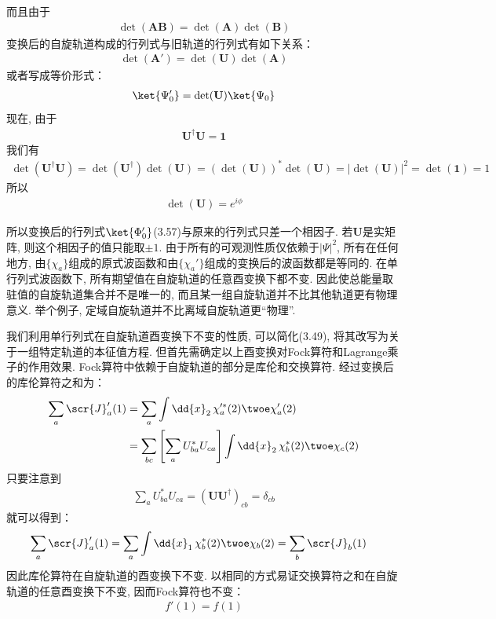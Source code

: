 而且由于
\begin{align}
	\det(\mathbf{AB}) = \det(\mathbf{A})\det(\mathbf{B})
\end{align}
变换后的自旋轨道构成的行列式与旧轨道的行列式有如下关系：
\begin{align}
	\det(\mathbf{A}') = \det(\mathbf{U})\det(\mathbf{A})
\end{align}
或者写成等价形式：
\begin{align}
	\ket{\Psi_0'} = \det(\mathbf{U})\ket{\Psi_0}
\end{align}
现在, 
由于
\begin{align}
	\mathbf{U}^\dagger\mathbf{U} = \mathbf{1}
\end{align}
我们有
\begin{align}
	\det(\mathbf{U}^\dagger\mathbf{U}) = \det(\mathbf{U}^\dagger)\det(\mathbf{U}) = (\det(\mathbf{U}))^*\det(\mathbf{U}) = |\det(\mathbf{U})|^2 = \det(\mathbf{1}) = 1
\end{align}
所以
\begin{align}
	\det(\mathbf{U}) = e^{i\phi}
\end{align}

所以变换后的行列式$\ket{\Phi_0'}$(3.57)与原来的行列式只差一个相因子. 
若$\mathbf{U}$是实矩阵, 
则这个相因子的值只能取$\pm 1$. 
由于所有的可观测性质仅依赖于$|\Psi|^2$, 
所有在任何地方, 
由$\{\chi_a\}$组成的原式波函数和由$\{\chi_a'\}$组成的变换后的波函数都是等同的. 
在单行列式波函数下, 
所有期望值在自旋轨道的任意酉变换下都不变. 
因此使总能量取驻值的自旋轨道集合并不是唯一的, 
而且某一组自旋轨道并不比其他轨道更有物理意义. 
举个例子, 
定域自旋轨道并不比离域自旋轨道更“物理”.


我们利用单行列式在自旋轨道酉变换下不变的性质, 
可以简化(3.49), 
将其改写为关于一组特定轨道的本征值方程. 
但首先需确定以上酉变换对Fock算符和Lagrange乘子的作用效果. 
Fock算符中依赖于自旋轨道的部分是库伦和交换算符. 
经过变换后的库伦算符之和为：
\begin{align}
	\sum_a \scr{J}_a'(1) & = \sum_a\int\dd{x}_2\,\chi_a^{\prime*}(2)\twoe\chi_a'(2)\notag\\
	& = \sum_{bc}\left[ \sum_a U_{ba}^* U_{ca}\right]\int\dd{x}_2\,\chi_b^*(2)\twoe\chi_c(2)
\end{align}
只要注意到
\begin{align}
	\sum_a U_{ba}^* U_{ca} = (\mathbf{UU}^\dagger)_{cb} = \delta_{cb}
\end{align}
就可以得到：
\begin{align}
	\sum_a \scr{J}_a'(1) & = \sum_a\int\dd{x}_1\,\chi_b^{*}(2)\twoe\chi_b(2) = \sum_{b}\scr{J}_b(1)
\end{align}
因此库伦算符在自旋轨道的酉变换下不变. 
以相同的方式易证交换算符之和在自旋轨道的任意酉变换下不变, 
因而Fock算符也不变：
\begin{align}
	f'(1) = f(1)
\end{align}

